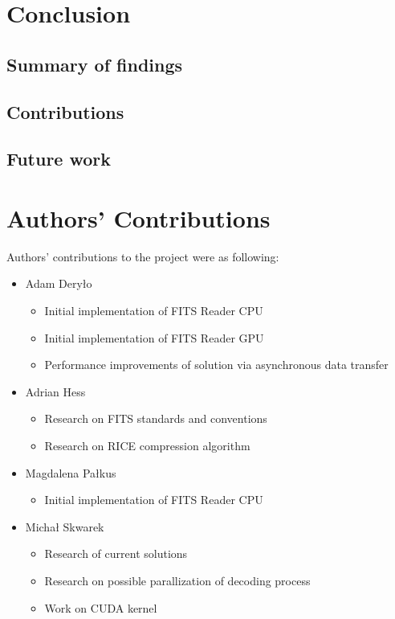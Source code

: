\documentclass[licencjacka,en]{pracamgr}
\begin{document}
\chapter{Conclusion}
\section{Summary of findings}
\section{Contributions}
\section{Future work}


\chapter{Authors’ Contributions}
Authors’ contributions to the project were as following: 


\begin{itemize}
    \item Adam Deryło 
    \begin{itemize}
        \item Initial implementation of FITS Reader CPU
        \item Initial implementation of FITS Reader GPU
        \item Performance improvements of solution via asynchronous data transfer
    \end{itemize}

    \item Adrian Hess
    \begin{itemize}
        \item Research on FITS standards and conventions
        \item Research on RICE compression algorithm 
    \end{itemize}

    \item Magdalena Pałkus 
    \begin{itemize}
        \item  Initial implementation of FITS Reader CPU
    \end{itemize}    

    \item Michał Skwarek 
    \begin{itemize}
        \item  Research of current solutions
        \item Research on possible parallization of decoding process
        \item Work on CUDA kernel
        
    \end{itemize}   
\end{itemize}
\end{document}
